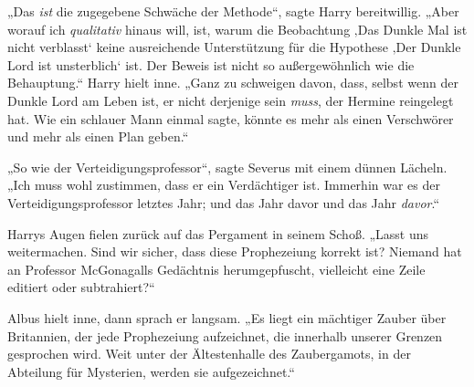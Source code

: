 „Das \emph{ist} die zugegebene Schwäche der Methode“, sagte Harry bereitwillig. „Aber worauf ich \emph{qualitativ} hinaus will, ist, warum die Beobachtung ‚Das Dunkle Mal ist nicht verblasst‘ keine ausreichende Unterstützung für die Hypothese ‚Der Dunkle Lord ist unsterblich‘ ist. Der Beweis ist nicht so außergewöhnlich wie die Behauptung.“ Harry hielt inne. „Ganz zu schweigen davon, dass, selbst wenn der Dunkle Lord am Leben ist, er nicht derjenige sein \emph{muss}, der Hermine reingelegt hat. Wie ein schlauer Mann einmal sagte, könnte es mehr als einen Verschwörer und mehr als einen Plan geben.“

„So wie der Verteidigungsprofessor“, sagte Severus mit einem dünnen Lächeln. „Ich muss wohl zustimmen, dass er ein Verdächtiger ist. Immerhin war es der Verteidigungsprofessor letztes Jahr; und das Jahr davor und das Jahr \emph{davor}.“

Harrys Augen fielen zurück auf das Pergament in seinem Schoß. „Lasst uns weitermachen. Sind wir sicher, dass diese Prophezeiung korrekt ist? Niemand hat an Professor McGonagalls Gedächtnis herumgepfuscht, vielleicht eine Zeile editiert oder subtrahiert?“

Albus hielt inne, dann sprach er langsam. „Es liegt ein mächtiger Zauber über Britannien, der jede Prophezeiung aufzeichnet, die innerhalb unserer Grenzen gesprochen wird. Weit unter der Ältestenhalle des Zaubergamots, in der Abteilung für Mysterien, werden sie aufgezeichnet.“

